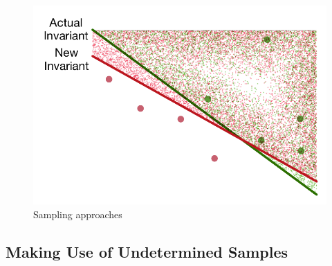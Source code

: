 \begin{figure}[t]
        \centering
        \includegraphics[scale=0.3]{figures/general-sampling-3.pdf}
    \caption{Sampling approaches}
    \label{fig:sampling}
\end{figure}

\subsection{Making Use of Undetermined Samples} \label{alternative}


